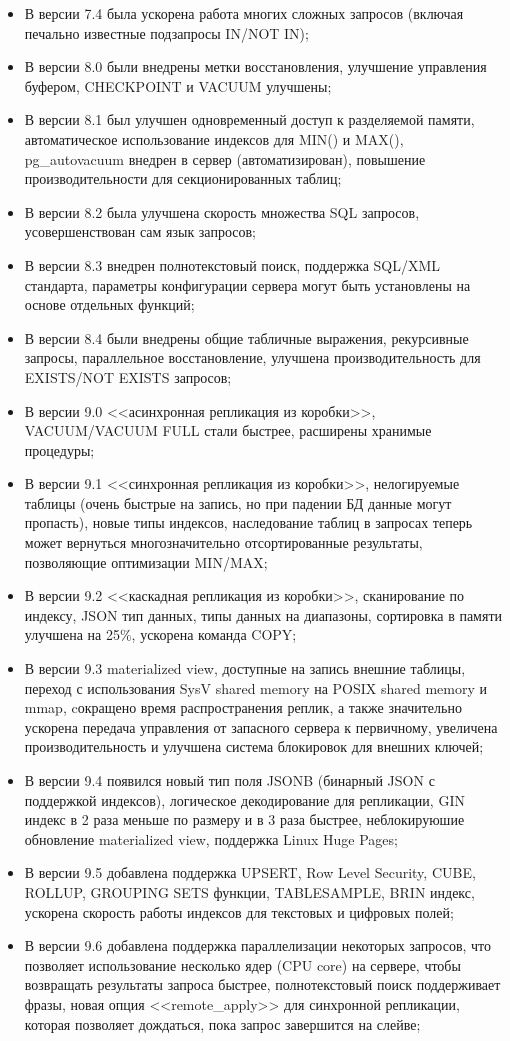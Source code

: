 \begin{itemize}
  \item В версии 7.4 была ускорена работа многих сложных запросов (включая печально известные подзапросы IN/NOT IN);
  \item В версии 8.0 были внедрены метки восстановления, улучшение управления буфером, CHECKPOINT и VACUUM улучшены;
  \item В версии 8.1 был улучшен одновременный доступ к разделяемой памяти, автоматическое использование индексов для MIN() и MAX(), pg\_autovacuum внедрен в сервер (автоматизирован), повышение производительности для секционированных таблиц;
  \item В версии 8.2 была улучшена скорость множества SQL запросов, усовершенствован сам язык запросов;
  \item В версии 8.3 внедрен полнотекстовый поиск, поддержка SQL/XML стандарта, параметры конфигурации сервера могут быть установлены на основе отдельных функций;
  \item В версии 8.4 были внедрены общие табличные выражения, рекурсивные запросы, параллельное восстановление, улучшена производительность для EXISTS/NOT EXISTS запросов;
  \item В версии 9.0 <<асинхронная репликация из коробки>>, VACUUM/VACUUM FULL стали быстрее, расширены хранимые процедуры;
  \item В версии 9.1 <<синхронная репликация из коробки>>, нелогируемые таблицы (очень быстрые на запись, но при падении БД данные могут пропасть), новые типы индексов, наследование таблиц в запросах теперь может вернуться многозначительно отсортированные результаты, позволяющие оптимизации MIN/MAX;
  \item В версии 9.2 <<каскадная репликация из коробки>>, сканирование по индексу, JSON тип данных, типы данных на диапазоны, сортировка в памяти улучшена на 25\%, ускорена команда COPY;
  \item В версии 9.3 materialized view, доступные на запись внешние таблицы, переход с использования SysV shared memory на POSIX shared memory и mmap, cокращено время распространения реплик, а также значительно ускорена передача управления от запасного сервера к первичному, увеличена производительность и улучшена система блокировок для внешних ключей;
  \item В версии 9.4 появился новый тип поля JSONB (бинарный JSON с поддержкой индексов), логическое декодирование для репликации, GIN индекс в 2 раза меньше по размеру и в 3 раза быстрее, неблокируюшие обновление materialized view, поддержка Linux Huge Pages;
  \item В версии 9.5 добавлена поддержка UPSERT, Row Level Security, CUBE, ROLLUP, GROUPING SETS функции, TABLESAMPLE, BRIN индекс, ускорена скорость работы индексов для текстовых и цифровых полей;
  \item В версии 9.6 добавлена поддержка параллелизации некоторых запросов, что позволяет использование несколько ядер (CPU core) на сервере, чтобы возвращать результаты запроса быстрее, полнотекстовый поиск поддерживает фразы, новая опция <<remote\_apply>> для синхронной репликации, которая позволяет дождаться, пока запрос завершится на слейве;
\end{itemize}

